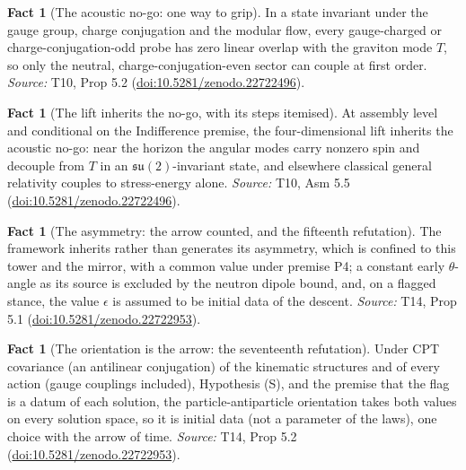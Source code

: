 \documentclass[11pt]{article}
\theoremstyle{definition}
\newtheorem{fact}[theorem]{Fact}
\theoremstyle{plain}
\begin{document}
\begin{fact}[The acoustic no-go: one way to grip]\label{c:dark-energy.acoustic-no-go-one-way-grip}
In a state invariant under the gauge group, charge conjugation and the modular flow, every gauge-charged or charge-conjugation-odd probe has zero linear overlap with the graviton mode $T$, so only the neutral, charge-conjugation-even sector can couple at first order.
\emph{Source:} T10, Prop 5.2 (\href{https://doi.org/10.5281/zenodo.22722496}{doi:10.5281/zenodo.22722496}).
\end{fact}

\begin{fact}[The lift inherits the no-go, with its steps itemised]\label{c:dark-energy.lift-inherits-no-go-steps-itemised}
At assembly level and conditional on the Indifference premise, the four-dimensional lift inherits the acoustic no-go: near the horizon the angular modes carry nonzero spin and decouple from $T$ in an $\mathfrak{su}(2)$-invariant state, and elsewhere classical general relativity couples to stress-energy alone.
\emph{Source:} T10, Asm 5.5 (\href{https://doi.org/10.5281/zenodo.22722496}{doi:10.5281/zenodo.22722496}).
\end{fact}

\begin{fact}[The asymmetry: the arrow counted, and the fifteenth refutation]\label{c:dark-matter.asymmetry-arrow-counted-fifteenth-refutation}
The framework inherits rather than generates its asymmetry, which is confined to this tower and the mirror, with a common value under premise P4; a constant early $\theta$-angle as its source is excluded by the neutron dipole bound, and, on a flagged stance, the value $\epsilon$ is assumed to be initial data of the descent.
\emph{Source:} T14, Prop 5.1 (\href{https://doi.org/10.5281/zenodo.22722953}{doi:10.5281/zenodo.22722953}).
\end{fact}

\begin{fact}[The orientation is the arrow: the seventeenth refutation]\label{c:dark-matter.orientation-arrow-seventeenth-refutation}
Under CPT covariance (an antilinear conjugation) of the kinematic structures and of every action (gauge couplings included), Hypothesis (S), and the premise that the flag is a datum of each solution, the particle-antiparticle orientation takes both values on every solution space, so it is initial data (not a parameter of the laws), one choice with the arrow of time.
\emph{Source:} T14, Prop 5.2 (\href{https://doi.org/10.5281/zenodo.22722953}{doi:10.5281/zenodo.22722953}).
\end{fact}
\end{document}
